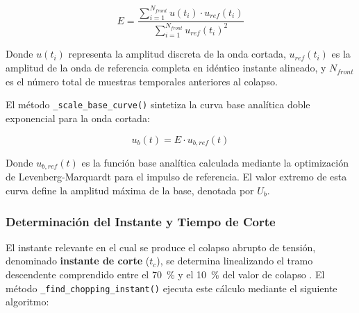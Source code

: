 \begin{equation}
\label{eq:factor_escala_e}
E = \frac{\sum_{i=1}^{N_{front}} u(t_i) \cdot u_{ref}(t_i)}{\sum_{i=1}^{N_{front}} u_{ref}(t_i)^2}
\end{equation}

Donde $u(t_i)$ representa la amplitud discreta de la onda cortada, $u_{ref}(t_i)$ es la amplitud de la onda de referencia completa en idéntico instante alineado, y $N_{front}$ es el número total de muestras temporales anteriores al colapso.

El método \texttt{\_scale\_base\_curve()} sintetiza la curva base analítica doble exponencial para la onda cortada:

\begin{equation}
\label{eq:curva_base_lic}
u_b(t) = E \cdot u_{b,ref}(t)
\end{equation}

Donde $u_{b,ref}(t)$ es la función base analítica calculada mediante la optimización de Levenberg-Marquardt para el impulso de referencia. El valor extremo de esta curva define la amplitud máxima de la base, denotada por $U_b$.

\subsubsection{Determinación del Instante y Tiempo de Corte}
\label{subsubsection:instante_tiempo_corte}

El instante relevante en el cual se produce el colapso abrupto de tensión, denominado \textbf{instante de corte} ($t_c$), se determina linealizando el tramo descendente comprendido entre el \qty{70}{\percent} y el \qty{10}{\percent} del valor de colapso \cite{iec60060_1}. El método \texttt{\_find\_chopping\_instant()} ejecuta este cálculo mediante el siguiente algoritmo:


